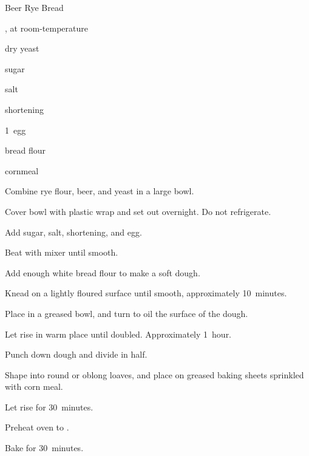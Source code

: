\begin{recipe}{Beer Rye Bread}{}{}

\begin{ingredients}
\item {} 
\item \C{1\half} , at room-temperature
\item \tp{4\half} dry yeast
\item {} sugar
\item {} salt
\item {} shortening
\item 1~egg
\item {} bread flour
\item {} cornmeal
\end{ingredients}

\begin{directions}
\item Combine rye flour, beer, and yeast in a large bowl.
\item Cover bowl with plastic wrap and set out overnight. Do not refrigerate.
\item Add sugar, salt, shortening, and egg.
\item Beat with mixer until smooth.
\item Add enough white bread flour to make a soft dough.
\item Knead on a lightly floured surface until smooth, approximately 10~minutes.
\item Place in a greased bowl, and turn to oil the surface of the dough.
\item Let rise in warm place until doubled. Approximately 1~hour.
\item Punch down dough and divide in half.
\item Shape into round or oblong loaves, and place on greased baking sheets sprinkled with corn meal.
\item Let rise for 30~minutes.
\item Preheat oven to .
\item Bake for 30~minutes.
\end{directions}

\end{recipe}
